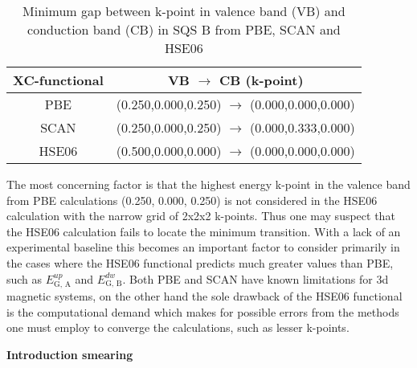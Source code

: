 \begin{table}[H]
\centering
\begin{tabular}{@{}cc@{}}
\toprule
XC-functional & VB $\rightarrow$ CB (k-point)                              \\ \midrule
PBE           & (0.250,0.000,0.250) $\rightarrow$ (0.000,0.000,0.000)  \\
SCAN          & (0.250,0.000,0.250) $\rightarrow$ (0.000,0.333,0.000)  \\
HSE06         & (0.500,0.000,0.000) $\rightarrow$ (0.000,0.000,0.000) \\ \bottomrule
\end{tabular}
\caption{Minimum gap between k-point in valence band (VB) and conduction band (CB) in SQS B from PBE, SCAN and HSE06}
\end{table}

The most concerning factor is that the highest energy k-point in the valence band from PBE calculations (0.250, 0.000, 0.250) is not considered in the HSE06 calculation with the narrow grid of 2x2x2 k-points. Thus one may suspect that the HSE06 calculation fails to locate the minimum transition. With a lack of an experimental baseline this becomes an important factor to consider primarily in the cases where the HSE06 functional predicts much greater values than PBE, such as $E_\text{G, A} ^{up}$ and $E_\text{G, B} ^{dw}$. Both PBE and SCAN have known limitations for 3d magnetic systems, on the other hand the sole drawback of the HSE06 functional is the computational demand which makes for possible errors from the methods one must employ to converge the calculations, such as lesser k-points. 

\textbf{Introduction smearing \\}


